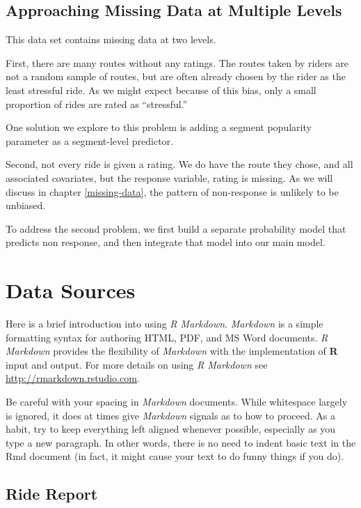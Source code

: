 \documentclass[12pt,twoside]{reedthesis}
\begin{document}
  \section{Approaching Missing Data at Multiple
  Levels}\label{approaching-missing-data-at-multiple-levels}
  
  This data set contains missing data at two levels.
  
  First, there are many routes without any ratings. The routes taken by
  riders are not a random sample of routes, but are often already chosen
  by the rider as the least stressful ride. As we might expect because of
  this bias, only a small proportion of rides are rated as ``stressful.''
  
  One solution we explore to this problem is adding a segment popularity
  parameter as a segment-level predictor.
  
  Second, not every ride is given a rating. We do have the route they
  chose, and all associated covariates, but the response variable, rating
  is missing. As we will discuss in chapter \autoref{missing-data}, the
  pattern of non-response is unlikely to be unbiased.
  
  To address the second problem, we first build a separate probability
  model that predicts non response, and then integrate that model into our
  main model.
  
  \chapter{Data Sources}\label{rmd-basics}
  
  Here is a brief introduction into using \emph{R Markdown}.
  \emph{Markdown} is a simple formatting syntax for authoring HTML, PDF,
  and MS Word documents. \emph{R Markdown} provides the flexibility of
  \emph{Markdown} with the implementation of \textbf{R} input and output.
  For more details on using \emph{R Markdown} see
  \url{http://rmarkdown.rstudio.com}.
  
  Be careful with your spacing in \emph{Markdown} documents. While
  whitespace largely is ignored, it does at times give \emph{Markdown}
  signals as to how to proceed. As a habit, try to keep everything left
  aligned whenever possible, especially as you type a new paragraph. In
  other words, there is no need to indent basic text in the Rmd document
  (in fact, it might cause your text to do funny things if you do).
  
  \section{Ride Report}\label{ride-report}
  
\end{document}
